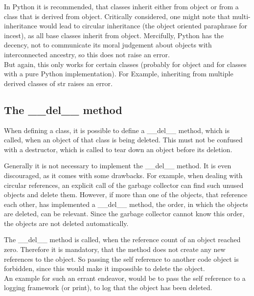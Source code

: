 			In Python it is recommended, that classes inherit either from {\normalfont \ttfamily object} or from a class that is derived from {\normalfont \ttfamily object}.
			Critically considered, one might note that multi-inheritance would lead to circular inheritance (the object oriented paraphrase for incest), as all base classes inherit from {\normalfont \ttfamily object}.
			Mercifully, Python has the decency, not to communicate its moral judgement about objects with interconnected ancestry, so this does not raise an error.\\
			But again, this only works for certain classes (probably for {\normalfont \ttfamily object} and for classes with a pure Python implementation).
			For Example, inheriting from multiple derived classes of {\normalfont \ttfamily str} raises an error.

		\subsection{The \_\_del\_\_ method}
			When defining a class, it is possible to define a {\normalfont \ttfamily \_\_del\_\_} method, which is called, when an object of that class is being deleted.
			This must not be confused with a destructor, which is called to tear down an object before its deletion.

			Generally it is not necessary to implement the {\normalfont \ttfamily \_\_del\_\_} method.
			It is even discouraged, as it comes with some drawbacks.
			For example, when dealing with circular references, an explicit call of the garbage collector can find such unused objects and delete them.
			However, if more than one of the objects, that reference each other, has implemented a {\normalfont \ttfamily \_\_del\_\_} method, the order, in which the objects are deleted, can be relevant.
			Since the garbage collector cannot know this order, the objects are not deleted automatically.

			The {\normalfont \ttfamily \_\_del\_\_} method is called, when the reference count of an object reached zero.
			Therefore it is mandatory, that the method does not create any new references to the object.
			So passing the {\normalfont \ttfamily self} reference to another code object is forbidden, since this would make it impossible to delete the object.\\
			An example for such an errant endeavor, would be to pass the {\normalfont \ttfamily self} reference to a logging framework (or print), to log that the object has been deleted.


